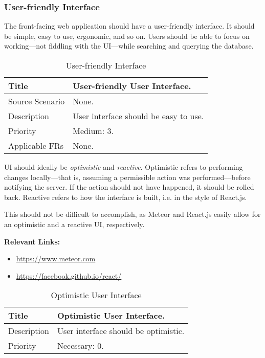 \subsubsection{User-friendly Interface}
  \label{system-requirements/non-functional/friendly-UI}
  The front-facing web application should have a user-friendly interface. It
  should be simple, easy to use, ergonomic, and so on. Users should be able to
  focus on working---not fiddling with the UI---while searching and querying the
  database.

  \begin{table}[h!]
    \caption{User-friendly Interface}
    \label{system-requirements/non-functional/friendly-UI-table}
    \begin{tabularx}{\textwidth}{|l|X|}
      \hline
      Title           & User-friendly User Interface. \\ \hline
      Source Scenario & None. \\ \hline
      Description     & User interface should be easy to use.\\ \hline
      Priority        & Medium: 3. \\ \hline
      Applicable FRs  & None. \\ \hline
    \end{tabularx}
  \end{table}

  UI should ideally be \textit{optimistic} and \textit{reactive}. Optimistic
  refers to performing changes locally---that is, assuming a permissible action
  was performed---before notifying the server. If the action should not have
  happened, it should be rolled back. Reactive refers to how the interface is
  built, i.e. in the style of React.js.

  This should not be difficult to accomplish, as Meteor and React.js easily
  allow for an optimistic and a reactive UI, respectively.

  \textbf{Relevant Links:}
  \begin{itemize}
    \item \url{https://www.meteor.com}
    \item \url{https://facebook.github.io/react/}
  \end{itemize}

  \begin{table}[h!]
    \caption{Optimistic User Interface}
    \label{system-requirements/non-functional/optimistic-UI-table}
    \begin{tabularx}{\textwidth}{|l|X|}
      \hline
      Title           & Optimistic User Interface. \\ \hline
      Description     & User interface should be optimistic.\\ \hline
      Priority        & Necessary: 0. \\ \hline
    \end{tabularx}
  \end{table}

